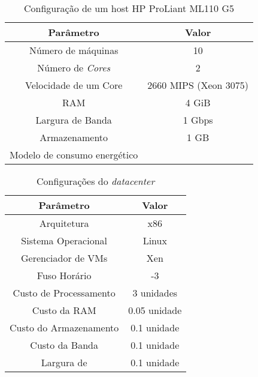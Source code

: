 \begin{table}
	\centering
    \begin{tabular}{|c|c|}
    \hline
    \textbf{Parâmetro}            & \textbf{Valor}     \\ \hline
    Número de máquinas            & 10                            \\
    Número de \emph{Cores}        & 2                             \\
    Velocidade de um Core         & 2660 MIPS (Xeon 3075)         \\
    RAM                           & 4 GiB                         \\
    Largura de Banda              & 1 Gbps                        \\
    Armazenamento                 & 1 GB                          \\
    Modelo de consumo energético  & \cite{spec:proliant_ml110_g5} \\ \hline
    \end{tabular}
    \caption {Configuração de um host HP ProLiant ML110 G5}
    \label{tab:configuracao_hp_g5}
\end{table}



\begin{table}
	\centering
    \begin{tabular}{|c|c|}
    \hline
    \textbf{Parâmetro}     & \textbf{Valor}     \\ \hline
    Arquitetura            & x86          \\
    Sistema Operacional    & Linux        \\
    Gerenciador de VMs     & Xen          \\
    Fuso Horário           & -3           \\
    Custo de Processamento & 3 unidades   \\
    Custo da RAM           & 0.05 unidade \\
    Custo do Armazenamento & 0.1 unidade  \\
    Custo da Banda         & 0.1 unidade  \\ \hline
    Largura de          & 0.1 unidade  \\ \hline
    \end{tabular}
    \caption {Configurações do \emph{datacenter}}
    \label{tab:configuracao_datacenter}
\end{table}



